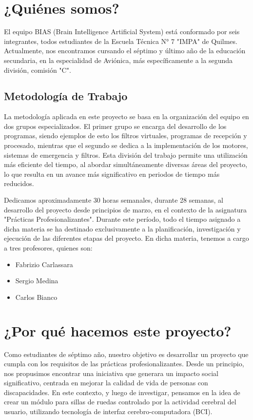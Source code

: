 \documentclass{article}
\begin{document}
\section{¿Quiénes somos?}
El equipo BIAS (Brain Intelligence Artificial System) está conformado por seis integrantes, todos estudiantes de la Escuela Técnica N° 7 "IMPA" de Quilmes. Actualmente, nos encontramos cursando el séptimo y último año de la educación secundaria, en la especialidad de Aviónica, más específicamente a la segunda división, comisión "C".


\subsection{Metodología de Trabajo}

La metodología aplicada en este proyecto se basa en la organización del equipo en dos grupos especializados. El primer grupo se encarga del desarrollo de los programas, siendo ejemplos de esto los filtros virtuales, programas de recepción y procesado, mientras que el segundo se dedica a la implementación de los motores, sistemas de emergencia y filtros. Esta división del trabajo permite una utilización más eficiente del tiempo, al abordar simultáneamente diversas áreas del proyecto, lo que resulta en un avance más significativo en periodos de tiempo más reducidos.

Dedicamos aproximadamente 30 horas semanales, durante 28 semanas, al desarrollo del proyecto desde principios de marzo, en el contexto de la asignatura "Prácticas Profesionalizantes". Durante este período, todo el tiempo asignado a dicha materia se ha destinado exclusivamente a la planificación, investigación y ejecución de las diferentes etapas del proyecto. En dicha materia, tenemos a cargo a tres profesores, quienes son:

\begin{itemize}
    \item Fabrizio Carlassara
    \item Sergio Medina
    \item Carlos Bianco
\end{itemize}


\section{¿Por qué hacemos este proyecto?}

Como estudiantes de séptimo año, nuestro objetivo es desarrollar un proyecto que cumpla con los requisitos de las prácticas profesionalizantes. Desde un principio, nos propusimos encontrar una iniciativa que generara un impacto social significativo, centrada en mejorar la calidad de vida de personas con discapacidades. En este contexto, y luego de investigar, pensamos en la idea de crear un módulo para sillas de ruedas controlado por la actividad cerebral del usuario, utilizando tecnología de interfaz cerebro-computadora (BCI).
\end{document}
